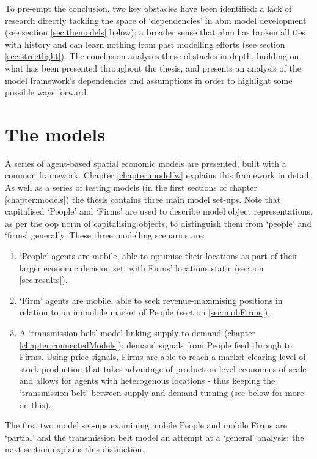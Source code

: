 To pre-empt the conclusion, two key obstacles have been identified: a lack of research directly tackling the space of `dependencies' in \gls{abm} model development (see section \ref{sec:themodels} below); a broader sense that \gls{abm} has broken all ties with history and can learn nothing from past modelling efforts (see section \ref{sec:streetlight}). The conclusion analyses these obstacles in depth, building on what has been presented throughout the thesis, and presents an analysis of the model framework's dependencies and assumptions in order to highlight some possible ways forward.

\section{The models \label{sec:themodels}}

A series of agent-based spatial economic models are presented, built with a common framework. Chapter \ref{chapter:modelfw} explains this framework in detail. As well as a series of testing models (in the first sections of chapter \ref{chapter:models}) the thesis contains three main model set-ups. Note that capitalised `People' and `Firms' are used to describe model object representations, as per the \gls{oop} norm of capitalising objects, to distinguish them from `people' and `firms' generally. These three modelling scenarios are:

\begin{enumerate}
	\item `People' agents are mobile, able to optimise their locations as part of their larger economic decision set, with Firms' locations static (section \ref{sec:results}).
	\item `Firm' agents are mobile, able to seek revenue-maximising positions in relation to an immobile market of People (section \ref{sec:mobFirms}).
	\item A `transmission belt' model linking supply to demand (chapter \ref{chapter:connectedModels}): demand signals from People feed through to Firms. Using price signals, Firms are able to reach a market-clearing level of stock production that takes advantage of production-level economies of scale and allows for agents with heterogenous locations - thus keeping the `transmission belt' between supply and demand turning (see below for more on this).
\end{enumerate}

The first two model set-ups examining mobile People and mobile Firms are `partial' and the transmission belt model an attempt at a `general' analysis; the next section explains this distinction. 

